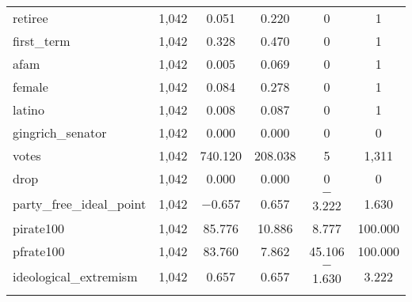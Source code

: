 \documentclass[12pt]{article}
\begin{document}
\begin{table}[H]
\begin{tabular}{@{\extracolsep{5pt}}lccccc}
		retiree & 1,042 & 0.051 & 0.220 & 0 & 1 \\ 
		first\_term & 1,042 & 0.328 & 0.470 & 0 & 1 \\ 
		afam & 1,042 & 0.005 & 0.069 & 0 & 1 \\ 
		female & 1,042 & 0.084 & 0.278 & 0 & 1 \\ 
		latino & 1,042 & 0.008 & 0.087 & 0 & 1 \\ 
		gingrich\_senator & 1,042 & 0.000 & 0.000 & 0 & 0 \\ 
		votes & 1,042 & 740.120 & 208.038 & 5 & 1,311 \\ 
		drop & 1,042 & 0.000 & 0.000 & 0 & 0 \\ 
		party\_free\_ideal\_point & 1,042 & $-$0.657 & 0.657 & $-$3.222 & 1.630 \\ 
		pirate100 & 1,042 & 85.776 & 10.886 & 8.777 & 100.000 \\ 
		pfrate100 & 1,042 & 83.760 & 7.862 & 45.106 & 100.000 \\ 
		ideological\_extremism & 1,042 & 0.657 & 0.657 & $-$1.630 & 3.222 \\ 
		\hline \\[-1.8ex] 
	\end{tabular} 
\end{table} 
\end{document}
